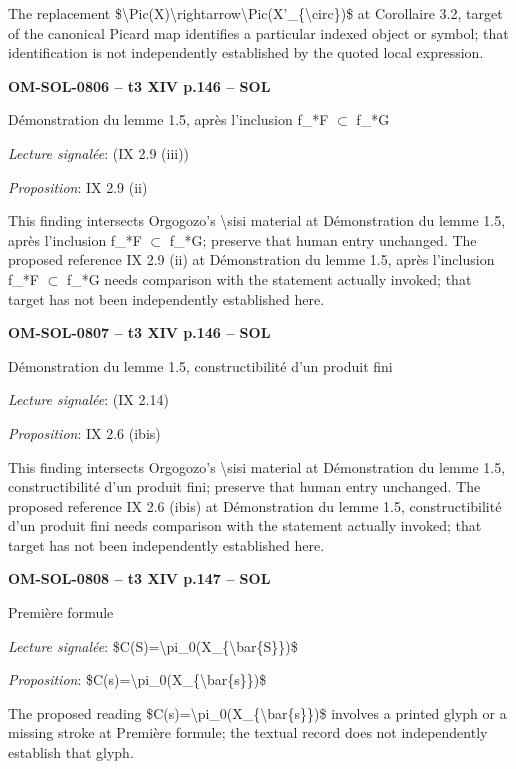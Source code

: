 The replacement \$\textbackslash{}Pic(X)\textbackslash{}rightarrow\textbackslash{}Pic(X'\_\{\textbackslash{}circ\})\$ at Corollaire 3.2, target of the canonical Picard map identifies a particular indexed object or symbol; that identification is not independently established by the quoted local expression.\par
\par\noindent\textbf{OM-SOL-0806 -- t3 XIV p.146 -- SOL}\par
Démonstration du lemme 1.5, après l'inclusion f\_*F \ensuremath{\subset} f\_*G\par
\emph{Lecture signalée}: (IX 2.9 (iii))\par
\emph{Proposition}: IX 2.9 (ii)\par
This finding intersects Orgogozo's \textbackslash{}sisi material at Démonstration du lemme 1.5, après l'inclusion f\_*F \ensuremath{\subset} f\_*G; preserve that human entry unchanged. The proposed reference IX 2.9 (ii) at Démonstration du lemme 1.5, après l'inclusion f\_*F \ensuremath{\subset} f\_*G needs comparison with the statement actually invoked; that target has not been independently established here.\par
\par\noindent\textbf{OM-SOL-0807 -- t3 XIV p.146 -- SOL}\par
Démonstration du lemme 1.5, constructibilité d'un produit fini\par
\emph{Lecture signalée}: (IX 2.14)\par
\emph{Proposition}: IX 2.6 (ibis)\par
This finding intersects Orgogozo's \textbackslash{}sisi material at Démonstration du lemme 1.5, constructibilité d'un produit fini; preserve that human entry unchanged. The proposed reference IX 2.6 (ibis) at Démonstration du lemme 1.5, constructibilité d'un produit fini needs comparison with the statement actually invoked; that target has not been independently established here.\par
\par\noindent\textbf{OM-SOL-0808 -- t3 XIV p.147 -- SOL}\par
Première formule\par
\emph{Lecture signalée}: \$C(S)=\allowbreak \textbackslash{}pi\_0(X\_\{\textbackslash{}bar\{S\}\})\$\par
\emph{Proposition}: \$C(s)=\allowbreak \textbackslash{}pi\_0(X\_\{\textbackslash{}bar\{s\}\})\$\par
The proposed reading \$C(s)=\allowbreak \textbackslash{}pi\_0(X\_\{\textbackslash{}bar\{s\}\})\$ involves a printed glyph or a missing stroke at Première formule; the textual record does not independently establish that glyph.\par
